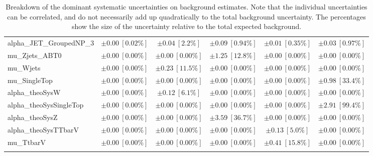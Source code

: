 \begin{sidewaystable}
\begin{center}
\begin{tabular*}{\textwidth}{@{\extracolsep{\fill}}lccccc}
alpha\_JET\_GroupedNP\_3         & $\pm 0.00\ [0.02\%] $          & $\pm 0.04\ [2.2\%] $          & $\pm 0.09\ [0.94\%] $          & $\pm 0.01\ [0.35\%] $          & $\pm 0.03\ [0.97\%] $       \\
mu\_Zjets\_ABT0         & $\pm 0.00\ [0.00\%] $          & $\pm 0.00\ [0.00\%] $          & $\pm 1.25\ [12.8\%] $          & $\pm 0.00\ [0.00\%] $          & $\pm 0.00\ [0.00\%] $       \\
mu\_Wjets         & $\pm 0.00\ [0.00\%] $          & $\pm 0.23\ [11.5\%] $          & $\pm 0.00\ [0.00\%] $          & $\pm 0.00\ [0.00\%] $          & $\pm 0.00\ [0.00\%] $       \\
mu\_SingleTop         & $\pm 0.00\ [0.00\%] $          & $\pm 0.00\ [0.00\%] $          & $\pm 0.00\ [0.00\%] $          & $\pm 0.00\ [0.00\%] $          & $\pm 0.98\ [33.4\%] $       \\
alpha\_theoSysW         & $\pm 0.00\ [0.00\%] $          & $\pm 0.12\ [6.1\%] $          & $\pm 0.00\ [0.00\%] $          & $\pm 0.00\ [0.00\%] $          & $\pm 0.00\ [0.00\%] $       \\
alpha\_theoSysSingleTop         & $\pm 0.00\ [0.00\%] $          & $\pm 0.00\ [0.00\%] $          & $\pm 0.00\ [0.00\%] $          & $\pm 0.00\ [0.00\%] $          & $\pm 2.91\ [99.4\%] $       \\
alpha\_theoSysZ         & $\pm 0.00\ [0.00\%] $          & $\pm 0.00\ [0.00\%] $          & $\pm 3.59\ [36.7\%] $          & $\pm 0.00\ [0.00\%] $          & $\pm 0.00\ [0.00\%] $       \\
alpha\_theoSysTTbarV         & $\pm 0.00\ [0.00\%] $          & $\pm 0.00\ [0.00\%] $          & $\pm 0.00\ [0.00\%] $          & $\pm 0.13\ [5.0\%] $          & $\pm 0.00\ [0.00\%] $       \\
mu\_TtbarV         & $\pm 0.00\ [0.00\%] $          & $\pm 0.00\ [0.00\%] $          & $\pm 0.00\ [0.00\%] $          & $\pm 0.41\ [15.8\%] $          & $\pm 0.00\ [0.00\%] $       \\
\noalign{\smallskip}\hline\noalign{\smallskip}
\end{tabular*}
\end{center}
\caption[Breakdown of uncertainty on background estimates]{
Breakdown of the dominant systematic uncertainties on background estimates.
Note that the individual uncertainties can be correlated, and do not necessarily add up quadratically to 
the total background uncertainty. The percentages show the size of the uncertainty relative to the total expected background.
\label{table.results.bkgestimate.uncertainties.SRA_T0_bybkg}}
\end{sidewaystable}
%